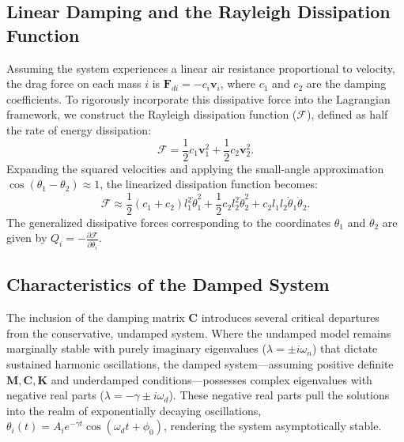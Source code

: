 \documentclass[12pt, a4paper, twoside]{article}
\begin{document}
\subsection{Linear Damping and the Rayleigh Dissipation Function}
Assuming the system experiences a linear air resistance proportional to velocity, the drag force on each mass $i$ is $\mathbf{F}_{di} = -c_i \mathbf{v}_i$, where $c_1$ and $c_2$ are the damping coefficients. To rigorously incorporate this dissipative force into the Lagrangian framework, we construct the Rayleigh dissipation function ($\mathcal{F}$), defined as half the rate of energy dissipation:
\begin{equation}
\mathcal{F} = \frac{1}{2} c_1 \mathbf{v}_1^2 + \frac{1}{2} c_2 \mathbf{v}_2^2.
\end{equation}
Expanding the squared velocities and applying the small-angle approximation $\cos(\theta_1 - \theta_2) \approx 1$, the linearized dissipation function becomes:
\begin{equation}
\mathcal{F} \approx \frac{1}{2}(c_1+c_2)l_1^2 \dot{\theta}_1^2 + \frac{1}{2}c_2 l_2^2 \dot{\theta}_2^2 + c_2 l_1 l_2 \dot{\theta}_1 \dot{\theta}_2.
\end{equation}
The generalized dissipative forces corresponding to the coordinates $\theta_1$ and $\theta_2$ are given by $Q_i = -\frac{\partial \mathcal{F}}{\partial \dot{\theta}_i}$.



\subsection{Characteristics of the Damped System}
The inclusion of the damping matrix $\mathbf{C}$ introduces several critical departures from the conservative, undamped system. Where the undamped model remains marginally stable with purely imaginary eigenvalues ($\lambda = \pm i\omega_n$) that dictate sustained harmonic oscillations, the damped system—assuming positive definite $\mathbf{M}, \mathbf{C}, \mathbf{K}$ and underdamped conditions—possesses complex eigenvalues with negative real parts ($\lambda = -\gamma \pm i\omega_d$). These negative real parts pull the solutions into the realm of exponentially decaying oscillations, $\theta_i(t) = A_i e^{-\gamma t} \cos(\omega_d t + \phi_0)$, rendering the system asymptotically stable. 
\end{document}
